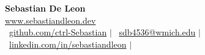 \documentclass[a4paper,10pt]{article}
\begin{document}
\begin{center}
	{\LARGE\textbf{Sebastian De Leon}} \\
	\vspace{0.1cm}
	\small\faGlobe \hspace{0.2cm}\href{https://sebastiandleon.dev}{www.sebastiandleon.dev} \\
	\small\faGithub\ \href{https://github.com/ctrl-Sebastian}{github.com/ctrl-Sebastian} $|$
	\faEnvelope\ \href{mailto:sdb4536@wmich.edu}{sdb4536@wmich.edu} $|$
	\faLinkedin\ \href{https://www.linkedin.com/in/sebastiandleon/}{linkedin.com/in/sebastiandleon} $|$
\end{center}
\vspace{-3mm}







\end{document}
